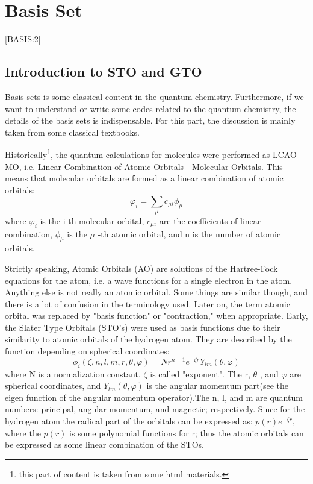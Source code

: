 \chapter{Basis Set}\ref{BASIS:2}

\section{Introduction to STO and GTO}
%
%
%
%
Basis sets is some classical content in the quantum chemistry.
Furthermore, if we want to understand or write some codes related to
the quantum chemistry, the details of the basis sets is
indispensable. For this part, the discussion is mainly taken from some
classical textbooks\cite{levine, szabo,Jensen}.

Historically\footnote{this part of content is taken from some html
  materials\cite{JKL}.}, the quantum calculations for molecules were
performed as LCAO MO, i.e. Linear Combination of Atomic Orbitals -
Molecular Orbitals. This means that molecular orbitals are formed as a
linear combination of atomic orbitals:
\begin{equation}\label{}
  \varphi_{i} = \sum_{\mu}c_{\mu i}\phi_{\mu}
\end{equation}
where $\varphi_{i}$ is the i-th molecular orbital, $c_{\mu i}$ are the
coefficients of linear combination, $\phi_{\mu}$ is the $\mu$ -th
atomic orbital, and n is the number of atomic orbitals.

Strictly speaking, Atomic Orbitals (AO) are solutions of the
Hartree-Fock equations for the atom, i.e. a wave functions for a
single electron in the atom. Anything else is not really an atomic
orbital. Some things are similar though, and there is a lot of
confusion in the terminology used. Later on, the term atomic orbital
was replaced by "basis function" or "contraction," when appropriate.
Early, the Slater Type Orbitals (STO's) were used as basis functions
due to their similarity to atomic orbitals of the hydrogen atom.  They
are described by the function depending on spherical coordinates:
\begin{equation}\label{}
  \phi_{i}(\zeta,n,l,m,r,\theta,\varphi) = Nr^{n-1}e^{-\zeta
    r}Y_{lm}(\theta,\varphi)
\end{equation}
where N is a normalization constant, $\zeta$ is called "exponent".
The r, $\theta$ , and $\varphi$ are spherical coordinates, and
$Y_{lm}(\theta,\varphi)$ is the angular momentum part(see the eigen
function of the angular momentum operator).The n, l, and m are quantum
numbers: principal, angular momentum, and magnetic;
respectively. Since for the hydrogen atom the radical part of the
orbitals can be expressed as: $p(r)e^{-\zeta r}$, where the $p(r)$ is
some polynomial functions for r; thus the atomic orbitals can be
expressed as some linear combination of the STOs.

